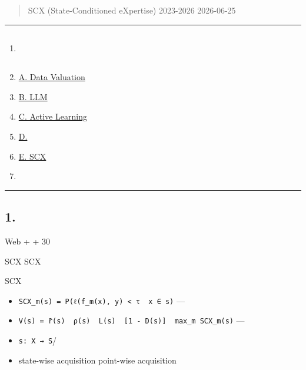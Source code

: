 \documentclass[
  12pt,
]{article}
\author{SCX}
\date{2026}
\providecommand{\tightlist}{%
  \setlength{\itemsep}{0pt}\setlength{\parskip}{0pt}}
\begin{document}
\section{}\label{ux7adeux4e89ux5206ux6790ux62a5ux544aux6570ux636eux4f30ux503cux4e0eux4e3bux52a8ux5b66ux4e60}

\begin{quote}
SCX (State-Conditioned eXpertise) 
2023-2026 2026-06-25
\end{quote}

\begin{center}\rule{0.5\linewidth}{0.5pt}\end{center}

\subsection{}\label{ux76eeux5f55}

\begin{enumerate}
\def\labelenumi{\arabic{enumi}.}
\tightlist
\item
  \hyperref[1-ux65b9ux6cd5ux8bbaux8bf4ux660e]{}
\item
  \hyperref[a-data-valuation-ux65b9ux6cd5]{A. Data Valuation }
\item
  \hyperref[b-llm-ux6570ux636eux9009ux62e9]{B. LLM }
\item
  \hyperref[c-active-learning]{C. Active Learning}
\item
  \hyperref[d-ux7adeux4e89ux683cux5c40ux603bux7ed3]{D. }
\item
  \hyperref[e-scx-ux7684ux72ecux7279ux5b9aux4f4d]{E. SCX }
\item
  \hyperref[7-ux53c2ux8003ux6587ux732e]{}
\end{enumerate}

\begin{center}\rule{0.5\linewidth}{0.5pt}\end{center}

\subsection{1. }\label{ux65b9ux6cd5ux8bbaux8bf4ux660e}

 Web  +  + 
30

SCX SCX 

SCX 

\begin{itemize}
\tightlist
\item
  \textbf{}\texttt{SCX\_m(s)\ =\ P(ℓ(f\_m(x),\ y)\ \textless{}\ τ\ \textbar{}\ x\ ∈\ s)}
  --- \textbf{}
\item
  \textbf{}\texttt{V(s)\ =\ r̄(s)\ \ ρ(s)\ \ L(s)\ \ {[}1\ -\ D(s){]}\ \ max\_m\ SCX\_m(s)}
  --- 
\item
  \textbf{}\texttt{s:\ X\ →\ S}/
\item
  \textbf{}state-wise acquisition
  point-wise acquisition
\end{itemize}
\end{document}
